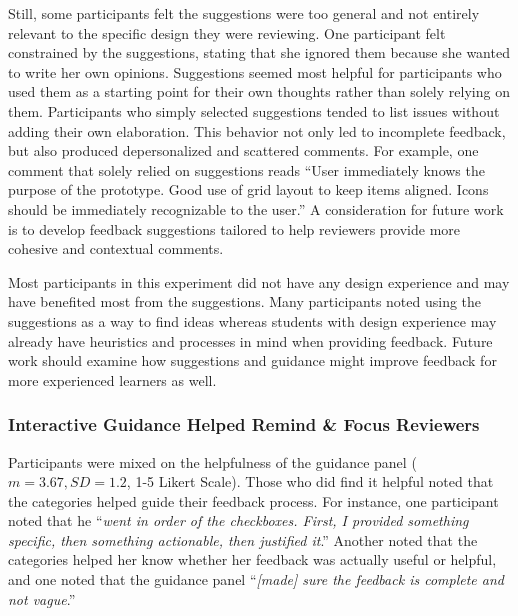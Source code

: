 Still, some participants felt the suggestions were too general and not entirely relevant to the specific design they were reviewing. One participant felt constrained by the suggestions, stating that she ignored them because she wanted to write her own opinions. Suggestions seemed most helpful for participants who used them as a starting point for their own thoughts rather than solely relying on them. Participants who simply selected suggestions tended to list issues without adding their own elaboration. This behavior not only led to incomplete feedback, but also produced depersonalized and scattered comments. For example, one comment that solely relied on suggestions reads ``User immediately knows the purpose of the prototype. Good use of grid layout to keep items aligned. Icons should be immediately recognizable to the user.'' A consideration for future work is to develop feedback suggestions tailored to help reviewers provide more cohesive and contextual comments. 

Most participants in this experiment did not have any design experience and may have benefited most from the suggestions. Many participants noted using the suggestions as a way to find ideas whereas students with design experience may already have heuristics and processes in mind when providing feedback. Future work should examine how suggestions and guidance might improve feedback for more experienced learners as well.

\subsubsection{Interactive Guidance Helped Remind \& Focus Reviewers} 
Participants were mixed on the helpfulness of the guidance panel ($m = 3.67, SD = 1.2$, 1-5 Likert Scale). Those who did find it helpful noted that the categories helped guide their feedback process. For instance, one participant noted that he ``\textit{went in order of the checkboxes. First, I provided something specific, then something actionable, then justified it}.'' Another noted that the categories helped her know whether her feedback was actually useful or helpful, and one noted that the guidance panel ``\textit{[made] sure the feedback is complete and not vague}.'' 

